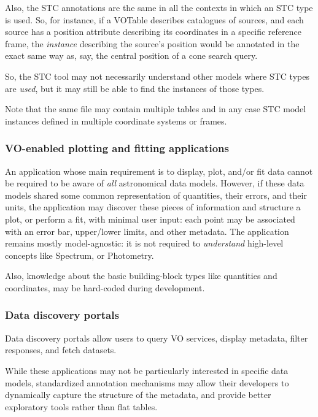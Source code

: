 \documentclass[11pt,a4paper]{ivoa}
\begin{document}
Also, the STC annotations are the same in all the contexts in which an
STC type is used. So, for instance, if a VOTable describes catalogues of
sources, and each source has a position attribute describing its
coordinates in a specific reference frame, the \emph{instance}
describing the source's position would be annotated in the exact same
way as, say, the central position of a cone search query.

So, the STC tool may not necessarily understand other models where STC
types are \emph{used}, but it may still be able to find the instances of
those types.

Note that the same file may contain multiple tables and in any case STC
model instances defined in multiple coordinate systems or frames.

\subsubsection{VO-enabled plotting and fitting
applications}\label{vo-enabled-plotting-and-fitting-applications}

An application whose main requirement is to display, plot, and/or fit
data cannot be required to be aware of \emph{all} astronomical data
models. However, if these data models shared some common representation
of quantities, their errors, and their units, the application may
discover these pieces of information and structure a plot, or perform a
fit, with minimal user input: each point may be associated with an error
bar, upper/lower limits, and other metadata. The application remains
mostly model-agnostic: it is not required to \emph{understand}
high-level concepts like Spectrum, or Photometry.

Also, knowledge about the basic building-block types like quantities and
coordinates, may be hard-coded during development.

\subsubsection{Data discovery portals}\label{data-discovery-portals}

Data discovery portals allow users to query VO services, display
metadata, filter responses, and fetch datasets.

While these applications may not be particularly interested in specific
data models, standardized annotation mechanisms may allow their
developers to dynamically capture the structure of the metadata, and
provide better exploratory tools rather than flat tables.
\end{document}
